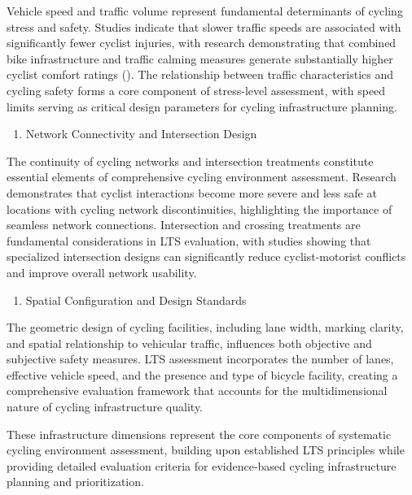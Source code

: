 \documentclass[
  12pt,
  oneside]{book}
\providecommand{\tightlist}{%
  \setlength{\itemsep}{0pt}\setlength{\parskip}{0pt}}
\begin{document}
Vehicle speed and traffic volume represent fundamental determinants of cycling stress and safety. Studies indicate that slower traffic speeds are associated with significantly fewer cyclist injuries, with research demonstrating that combined bike infrastructure and traffic calming measures generate substantially higher cyclist comfort ratings (\textcite{fitch_what_2022}). The relationship between traffic characteristics and cycling safety forms a core component of stress-level assessment, with speed limits serving as critical design parameters for cycling infrastructure planning.

\begin{enumerate}
\def\labelenumi{\arabic{enumi}.}
\setcounter{enumi}{2}
\tightlist
\item
  Network Connectivity and Intersection Design
\end{enumerate}

The continuity of cycling networks and intersection treatments constitute essential elements of comprehensive cycling environment assessment. Research demonstrates that cyclist interactions become more severe and less safe at locations with cycling network discontinuities, highlighting the importance of seamless network connections. Intersection and crossing treatments are fundamental considerations in LTS evaluation, with studies showing that specialized intersection designs can significantly reduce cyclist-motorist conflicts and improve overall network usability.

\begin{enumerate}
\def\labelenumi{\arabic{enumi}.}
\setcounter{enumi}{3}
\tightlist
\item
  Spatial Configuration and Design Standards
\end{enumerate}

The geometric design of cycling facilities, including lane width, marking clarity, and spatial relationship to vehicular traffic, influences both objective and subjective safety measures. LTS assessment incorporates the number of lanes, effective vehicle speed, and the presence and type of bicycle facility, creating a comprehensive evaluation framework that accounts for the multidimensional nature of cycling infrastructure quality.

These infrastructure dimensions represent the core components of systematic cycling environment assessment, building upon established LTS principles while providing detailed evaluation criteria for evidence-based cycling infrastructure planning and prioritization.
\end{document}
